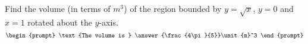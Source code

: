 \documentclass{ximera}
\author{Gregory Hartman \and Matthew Carr}
\begin{document}
\begin{exercise}






Find the volume (in terms of $\unit{m}^3$) of the region bounded by $y=\sqrt{x}$, $y=0$ and $x=1$ rotated about the $y$-axis.
\[
\begin{prompt}
\text{The volume is } \answer{\frac{4\pi}{5}}\unit{m}^3
\end{prompt}
\]




\end{exercise}
\end{document}
